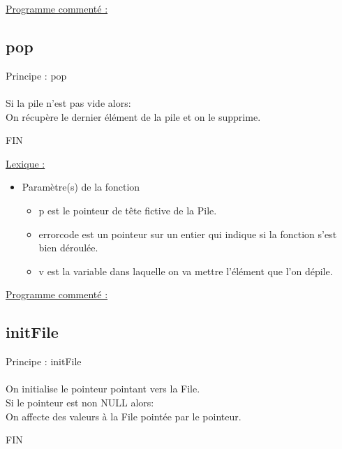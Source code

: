 \documentclass[a4paper]{article}
\newcommand\tab[1][1cm]{\hspace*{#1}}
\begin{document}
\underline{Programme commenté :}
\subsection{pop}

\begin{algorithm}

Principe : pop
\\
\\
\tab Si la pile n'est pas vide alors:
\\
\tab \tab On récupère le dernier élément de la pile et on le supprime.


FIN

\end{algorithm}


\underline{Lexique :}

\begin{itemize}

\item Paramètre(s) de la fonction  

\begin{itemize}

\item p est le pointeur de tête fictive de la Pile.

\item errorcode est un pointeur sur un entier qui indique si la fonction s'est bien déroulée.

\item v est la variable dans laquelle on va mettre l'élément que l'on dépile.

\end{itemize}
\end{itemize}
\underline{Programme commenté :}
\newpage
\subsection{initFile}

\begin{algorithm}

Principe : initFile
\\
\\
\tab On initialise le pointeur pointant vers la File.
\\
\tab Si le pointeur est non NULL alors:
\\
\tab \tab On affecte des valeurs à la File pointée par le pointeur.



FIN

\end{algorithm}
\end{document}
